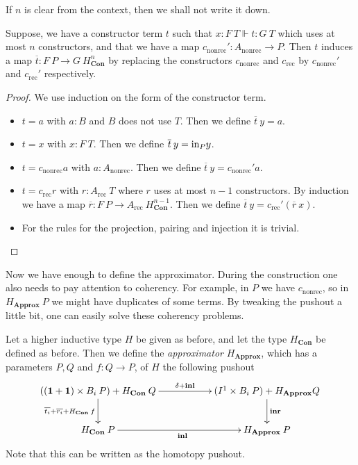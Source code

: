 \documentclass[a4paper,UKenglish]{lipics-v2016}
\newcommand{\inn}{{\rm in}}
\newcommand{\one}[0]{\textbf{1}}
\newcommand{\rec}[0]{\operatorname{rec}}
\newcommand{\nonrec}[0]{\operatorname{nonrec}}
\newcommand{\Con}[0]{\textbf{Con}}
\newcommand{\Approx}[0]{\textbf{Approx}}
\newcommand{\inl}[0]{\operatorname{\textbf{inl}}}
\newcommand{\inr}[0]{\operatorname{\textbf{inr}}}
\begin{document}
If $n$ is clear from the context, then we shall not write it down.

\begin{lemma}
Suppose, we have a constructor term $t$ such that $x : F \> T \Vdash t : G \>T$ which uses at most $n$ constructors, and that we have a map $c_{\nonrec}' : A_{\nonrec} \rightarrow P$.
Then $t$ induces a map $\overline{t} : F \> P \rightarrow G \> H_{\Con}^n$ by replacing the constructors $c_{\nonrec}$ and $c_{\rec}$ by $c_{\nonrec}'$ and $c_{\rec}'$ respectively.
\end{lemma}

\begin{proof}
We use induction on the form of the constructor term.
\begin{itemize}
	\item $t = a$ with $a : B$ and $B$ does not use $T$. Then we define $\overline{t} \> y = a$.
	\item $t = x$ with $x : F \> T$. Then we define $\overline{t} \> y = \inn_P y$.
	\item $t = c_{\nonrec} a$ with $a : A_{\nonrec}$. Then we define $\overline{t} \> y = c_{\nonrec}' a$.
	\item $t = c_{\rec} r$ with $r : A_{\rec} \> T$ where $r$ uses at most $n-1$ constructors. 
			  By induction we have a map $\overline{r} : F \> P \rightarrow A_{\rec} \> H_{\Con}^{n-1}$.
			  Then we define $\overline{t} \> y = c_{\rec}' (\overline{r} \> x)$.
	\item For the rules for the projection, pairing and injection it is trivial. \qedhere
\end{itemize}
\end{proof}

Now we have enough to define the approximator.
During the construction one also needs to pay attention to coherency.
For example, in $P$ we have $c_{\nonrec}$, so in $H_{\Approx} \> P$ we might have duplicates of some terms.
By tweaking the pushout a little bit, one can easily solve these coherency problems.

\begin{definition}
Let a higher inductive type $H$ be given as before, and let the type $H_{\Con}$ be defined as before.
Then we define the \emph{approximator} $H_{\Approx}$, which has a parameters $P, Q$ and $f : Q \rightarrow P$, of $H$ the following pushout
\[
\xymatrix
{
	((\one + \one) \times B_i \> P) + H_{\Con} \> Q \ar[d]_{\overline{t_i} + \overline{r_i} + H_{\Con} \> f} \ar[rr]^-{\delta + \inl} & & (I^1 \times B_i \> P) + H_{\Approx} Q  \ar[d]^{\inr}\\
	H_{\Con} \> P \ar[rr]_{\inl} & & H_{\Approx} \> P
}
\]
Note that this can be written as the homotopy pushout.
\end{definition}
\end{document}
